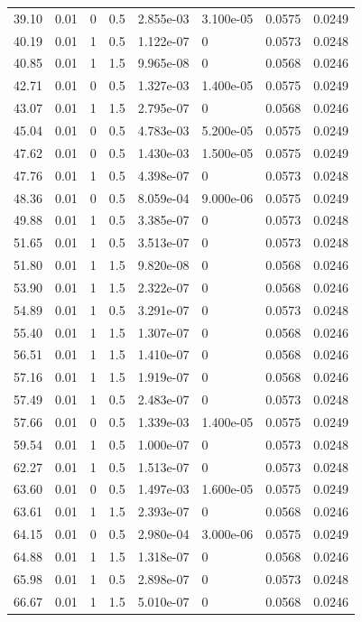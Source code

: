 \documentclass[preview]{standalone}
\begin{document}
{{\begin{tabular}{L{1.2cm}C{1.2cm} C{0.3cm}C{0.5cm} C{1.4cm}C{1.4cm} C{1.4cm}C{1.4cm}}
  39.10  &  0.01  & 0     & 0.5 &  2.855e-03  & 3.100e-05  & 0.0575 &  0.0249   \\ 
  40.19  &  0.01  & 1     & 0.5 &  1.122e-07  & 0  & 0.0573 &  0.0248   \\ 
  40.85  &  0.01  & 1     & 1.5 &  9.965e-08  & 0  & 0.0568 &  0.0246   \\ 
  42.71  &  0.01  & 0     & 0.5 &  1.327e-03  & 1.400e-05  & 0.0575 &  0.0249   \\ 
  43.07  &  0.01  & 1     & 1.5 &  2.795e-07  & 0  & 0.0568 &  0.0246   \\ 
  45.04  &  0.01  & 0     & 0.5 &  4.783e-03  & 5.200e-05  & 0.0575 &  0.0249   \\ 
  47.62  &  0.01  & 0     & 0.5 &  1.430e-03  & 1.500e-05  & 0.0575 &  0.0249   \\ 
  47.76  &  0.01  & 1     & 0.5 &  4.398e-07  & 0  & 0.0573 &  0.0248   \\ 
  48.36  &  0.01  & 0     & 0.5 &  8.059e-04  & 9.000e-06  & 0.0575 &  0.0249   \\ 
  49.88  &  0.01  & 1     & 0.5 &  3.385e-07  & 0  & 0.0573 &  0.0248   \\ 
  51.65  &  0.01  & 1     & 0.5 &  3.513e-07  & 0  & 0.0573 &  0.0248   \\ 
  51.80  &  0.01  & 1     & 1.5 &  9.820e-08  & 0  & 0.0568 &  0.0246   \\ 
  53.90  &  0.01  & 1     & 1.5 &  2.322e-07  & 0  & 0.0568 &  0.0246   \\ 
  54.89  &  0.01  & 1     & 0.5 &  3.291e-07  & 0  & 0.0573 &  0.0248   \\ 
  55.40  &  0.01  & 1     & 1.5 &  1.307e-07  & 0  & 0.0568 &  0.0246   \\ 
  56.51  &  0.01  & 1     & 1.5 &  1.410e-07  & 0  & 0.0568 &  0.0246   \\ 
  57.16  &  0.01  & 1     & 1.5 &  1.919e-07  & 0  & 0.0568 &  0.0246   \\ 
  57.49  &  0.01  & 1     & 0.5 &  2.483e-07  & 0  & 0.0573 &  0.0248   \\ 
  57.66  &  0.01  & 0     & 0.5 &  1.339e-03  & 1.400e-05  & 0.0575 &  0.0249   \\ 
  59.54  &  0.01  & 1     & 0.5 &  1.000e-07  & 0  & 0.0573 &  0.0248   \\ 
  62.27  &  0.01  & 1     & 0.5 &  1.513e-07  & 0  & 0.0573 &  0.0248   \\ 
  63.60  &  0.01  & 0     & 0.5 &  1.497e-03  & 1.600e-05  & 0.0575 &  0.0249   \\ 
  63.61  &  0.01  & 1     & 1.5 &  2.393e-07  & 0  & 0.0568 &  0.0246   \\ 
  64.15  &  0.01  & 0     & 0.5 &  2.980e-04  & 3.000e-06  & 0.0575 &  0.0249   \\ 
  64.88  &  0.01  & 1     & 1.5 &  1.318e-07  & 0  & 0.0568 &  0.0246   \\ 
  65.98  &  0.01  & 1     & 0.5 &  2.898e-07  & 0  & 0.0573 &  0.0248   \\ 
  66.67  &  0.01  & 1     & 1.5 &  5.010e-07  & 0  & 0.0568 &  0.0246   \\ 
\hline 
\end{tabular} 

}}
\end{document}
